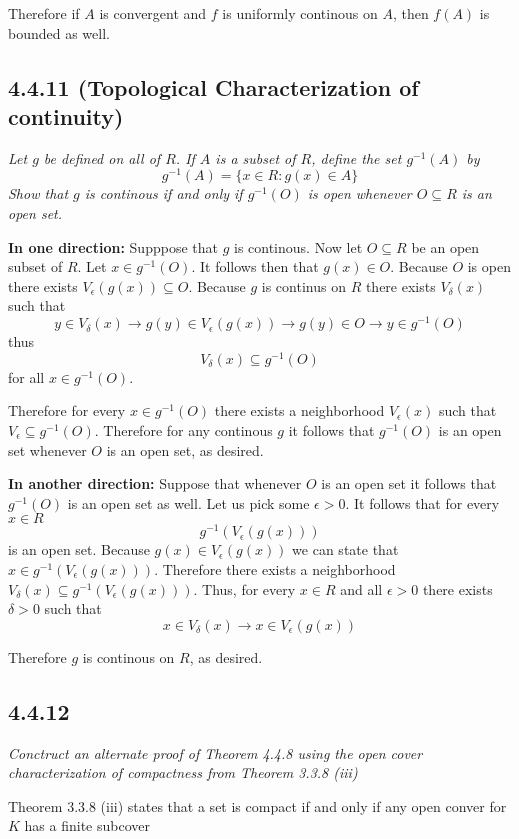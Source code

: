 \documentclass[11pt,oneside,titlepage]{book}
\begin{document}
Therefore if $A$ is convergent and $f$ is uniformly continous on $A$, then
$f(A)$ is bounded as well.

\subsection*{4.4.11 (Topological Characterization of continuity)}
\textit{Let $g$ be defined on all of $R$. If $A$ is a subset of $R$, define the
  set $g^{-1}(A)$ by }
$$g^{-1}(A) = \{x \in R: g(x) \in A\}$$
\textit{Show that $g$ is continous if and only if $g^{-1}(O)$ is open whenever
  $O \subseteq R$ is an open set.}

\textbf{In one direction: }
Supppose that $g$ is continous. Now let $O \subseteq R$ be an open subset of
$R$. Let $x \in g^{-1}(O)$. It follows then that $g(x) \in O$. Because
$O$ is open there exists $V_\epsilon(g(x)) \subseteq O$. Because $g$ is
continus on $R$ there exists $V_\delta(x)$ such that
$$y \in V_\delta(x) \to g(y) \in V_\epsilon(g(x)) \to
g(y) \in O \to y \in g^{-1}(O)$$
thus
$$V_\delta(x) \subseteq  g^{-1}(O)$$
for all $x \in g^{-1}(O)$.

Therefore for every $x \in g^{-1}(O)$ there exists a neighborhood
$V_\epsilon(x)$ such that $V_\epsilon \subseteq g^{-1}(O)$. Therefore
for any continous $g$ it follows that $g^{-1}(O)$ is an open set  whenever
$O$ is an open set, as desired.

\textbf{In another direction: }
Suppose that whenever $O$ is an open set it follows that $g^{-1}(O)$ is an
open set as well. Let us pick some $\epsilon > 0$. It follows that for
every $x \in R$
$$g^{-1}(V_\epsilon(g(x)))$$
is an open set. Because $g(x) \in V_\epsilon(g(x))$ we can state that
$x \in g^{-1}(V_\epsilon(g(x)))$. Therefore there exists a neighborhood
$V_\delta(x) \subseteq g^{-1}(V_\epsilon(g(x)))$. Thus, for every $x \in R$ and
all $\epsilon > 0$ there exists $\delta > 0$ such that
$$x \in V_\delta(x) \to x \in V_\epsilon(g(x))$$

Therefore $g$ is continous on $R$, as desired.

\subsection*{4.4.12}
\textit{Conctruct an alternate proof of Theorem 4.4.8 using the open cover
  characterization of compactness from Theorem 3.3.8 (iii)}

Theorem 3.3.8 (iii) states that a set is compact if and only if any open conver
for $K$ has a finite subcover
\end{document}
